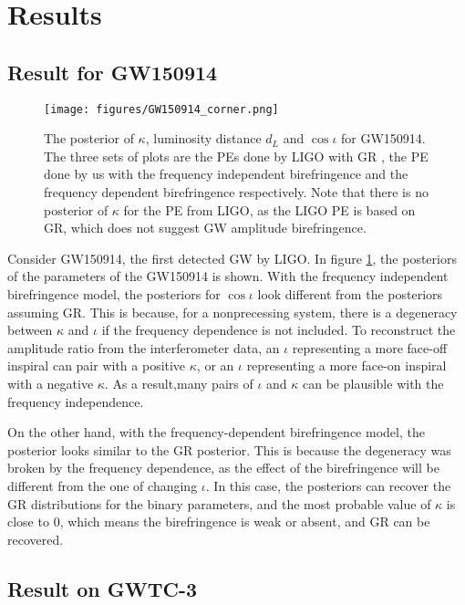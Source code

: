 \documentclass[twocolumn]{aastex631}
\begin{document}
\section{Results}

\subsection{Result for GW150914}

\begin{figure}[h!]
    \texttt{[image: figures/GW150914\_corner.png]}
    \caption{
        The posterior of $\kappa$, luminosity distance $d_L$ and $\cos{\iota}$ for GW150914.
    The three sets of plots are the PEs done by LIGO with GR \citep{GWTC-2.1, GWTC-3},
    the PE done by us with the frequency independent birefringence and the frequency dependent birefringence respectively.
    Note that there is no posterior of $\kappa$ for the PE from LIGO, as the LIGO PE is based on GR,
    which does not suggest GW amplitude birefringence.
    }
    \label{fig:GW150914_corner}
\end{figure}

Consider GW150914, the first detected GW by LIGO. In figure \ref{fig:GW150914_corner}, the posteriors of the parameters of the GW150914 is shown.
With the frequency independent birefringence model, the posteriors for $\cos\iota$ look different from the posteriors assuming GR.
This is because, for a nonprecessing system, there is a degeneracy between $\kappa$ and $\iota$ if the frequency dependence is not included.
To reconstruct the amplitude ratio from the interferometer data, an $\iota$ representing a more face-off inspiral can pair with a positive $\kappa$,
or an $\iota$ representing a more face-on inspiral with a negative $\kappa$.
As a result,many pairs of $\iota$ and $\kappa$ can be plausible with the frequency independence.

On the other hand, with the frequency-dependent birefringence model, the posterior looks similar to the GR posterior.
This is because the degeneracy was broken by the frequency dependence, as the effect of the birefringence will be different from the one of changing $\iota$.
In this case, the posteriors can recover the GR distributions for the binary parameters,
and the most probable value of $\kappa$ is close to $0$, which means the birefringence is weak or absent, and GR can be recovered.

\subsection{Result on GWTC-3}
\end{document}
